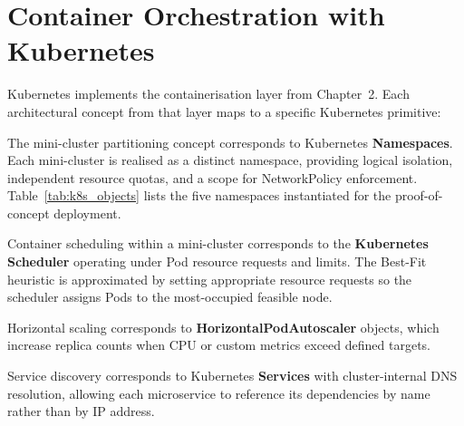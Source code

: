 \documentclass[12pt,a4paper]{report}
\begin{document}
\section{Container Orchestration with Kubernetes}

Kubernetes implements the containerisation layer from Chapter~2. Each architectural
concept from that layer maps to a specific Kubernetes primitive:

The mini-cluster partitioning concept corresponds to Kubernetes \textbf{Namespaces}.
Each mini-cluster is realised as a distinct namespace, providing logical isolation,
independent resource quotas, and a scope for NetworkPolicy enforcement. Table~\ref{tab:k8s_objects}
lists the five namespaces instantiated for the proof-of-concept deployment.

Container scheduling within a mini-cluster corresponds to the \textbf{Kubernetes
Scheduler} operating under Pod resource requests and limits. The Best-Fit heuristic
is approximated by setting appropriate resource requests so the scheduler assigns
Pods to the most-occupied feasible node.

Horizontal scaling corresponds to \textbf{HorizontalPodAutoscaler} objects, which
increase replica counts when CPU or custom metrics exceed defined targets.

Service discovery corresponds to Kubernetes \textbf{Services} with cluster-internal
DNS resolution, allowing each microservice to reference its dependencies by name
rather than by IP address.
\end{document}

